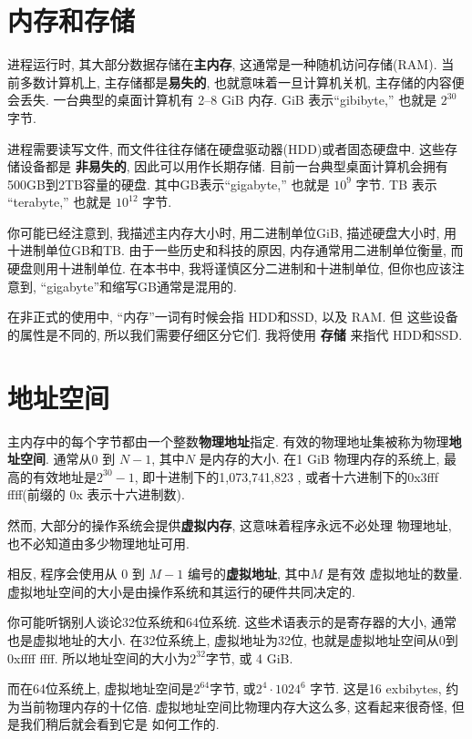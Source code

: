 \documentclass[12pt]{book}
\begin{document}
{\section{内存和存储}

进程运行时, 其大部分数据存储在{\bf 主内存}, 这通常是一种随机访问存储(RAM).
当前多数计算机上, 主存储都是{\bf 易失的}, 也就意味着一旦计算机关机, 
主存储的内容便会丢失. 一台典型的桌面计算机有 2--8 GiB 内存.
GiB 表示``gibibyte,'' 也就是 $2^{30}$ 字节.

进程需要读写文件, 而文件往往存储在硬盘驱动器(HDD)或者固态硬盘中.
这些存储设备都是 {\bf 非易失的}, 因此可以用作长期存储.
目前一台典型桌面计算机会拥有500GB到2TB容量的硬盘.
其中GB表示``gigabyte,'' 也就是 $10^9$ 字节.
TB 表示 ``terabyte,'' 也就是 $10^{12}$ 字节.

你可能已经注意到, 我描述主内存大小时, 用二进制单位GiB,
描述硬盘大小时, 用十进制单位GB和TB.
由于一些历史和科技的原因, 内存通常用二进制单位衡量, 而硬盘则用十进制单位.
在本书中, 我将谨慎区分二进制和十进制单位,
但你也应该注意到, ``gigabyte''和缩写GB通常是混用的.

在非正式的使用中, ``内存''一词有时候会指 HDD和SSD, 以及 RAM. 但
这些设备的属性是不同的, 所以我们需要仔细区分它们. 我将使用
{\bf 存储} 来指代 HDD和SSD.


\section{地址空间}

主内存中的每个字节都由一个整数{\bf 物理地址}指定.
有效的物理地址集被称为物理{\bf 地址空间}.
通常从0 到 $N-1$, 其中$N$ 是内存的大小.
在1 GiB 物理内存的系统上, 最高的有效地址是$2^{30}-1$, 
即十进制下的1,073,741,823 , 或者十六进制下的0x3fff ffff(前缀的 0x 表示十六进制数).

然而, 大部分的操作系统会提供{\bf 虚拟内存}, 这意味着程序永远不必处理
物理地址, 也不必知道由多少物理地址可用.

相反, 程序会使用从 0 到 $M-1$ 编号的{\bf 虚拟地址}, 其中$M$ 是有效
虚拟地址的数量. 虚拟地址空间的大小是由操作系统和其运行的硬件共同决定的.

你可能听锅别人谈论32位系统和64位系统.
这些术语表示的是寄存器的大小, 通常也是虚拟地址的大小.
在32位系统上, 虚拟地址为32位, 也就是虚拟地址空间从0到0xffff ffff.
所以地址空间的大小为$2^{32}$字节, 或 4 GiB.

而在64位系统上, 虚拟地址空间是$2^{64}$字节, 或$2^4 \cdot 1024^6$ 字节.
这是16 exbibytes, 约为当前物理内存的十亿倍.
虚拟地址空间比物理内存大这么多, 这看起来很奇怪, 但是我们稍后就会看到它是
如何工作的.

}
\end{document}
